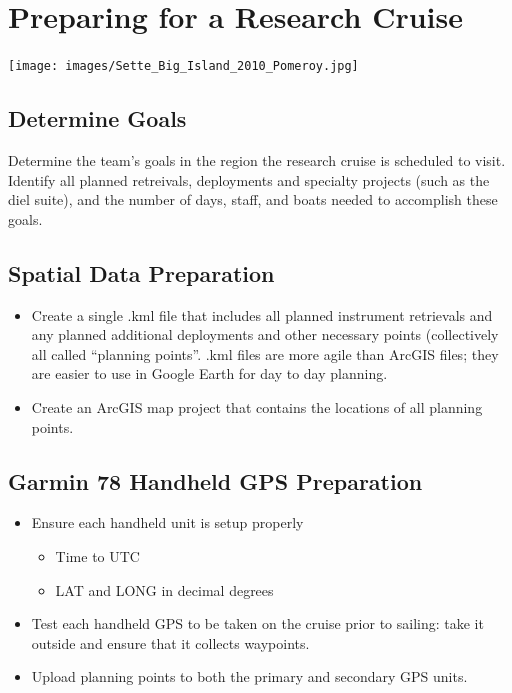 \documentclass[]{book}
\providecommand{\tightlist}{%
  \setlength{\itemsep}{0pt}\setlength{\parskip}{0pt}}
\begin{document}
\hypertarget{cruise_prep}{%
\chapter{Preparing for a Research Cruise}\label{cruise_prep}}

\texttt{[image: images/Sette\_Big\_Island\_2010\_Pomeroy.jpg]}

\hypertarget{determine-goals}{%
\section{Determine Goals}\label{determine-goals}}

Determine the team's goals in the region the research cruise is scheduled to visit. Identify all planned retreivals, deployments and specialty projects (such as the diel suite), and the number of days, staff, and boats needed to accomplish these goals.

\hypertarget{spatial-data-preparation}{%
\section{Spatial Data Preparation}\label{spatial-data-preparation}}

\begin{itemize}
\tightlist
\item
  Create a single .kml file that includes all planned instrument retrievals and any planned additional deployments and other necessary points (collectively all called ``planning points''. .kml files are more agile than ArcGIS files; they are easier to use in Google Earth for day to day planning.
\item
  Create an ArcGIS map project that contains the locations of all planning points.
\end{itemize}

\hypertarget{garmin-78-handheld-gps-preparation}{%
\section{Garmin 78 Handheld GPS Preparation}\label{garmin-78-handheld-gps-preparation}}

\begin{itemize}
\tightlist
\item
  Ensure each handheld unit is setup properly

  \begin{itemize}
  \tightlist
  \item
    Time to UTC
  \item
    LAT and LONG in decimal degrees
  \end{itemize}
\item
  Test each handheld GPS to be taken on the cruise prior to sailing: take it outside and ensure that it collects waypoints.
\item
  Upload planning points to both the primary and secondary GPS units.
\end{itemize}
\end{document}
